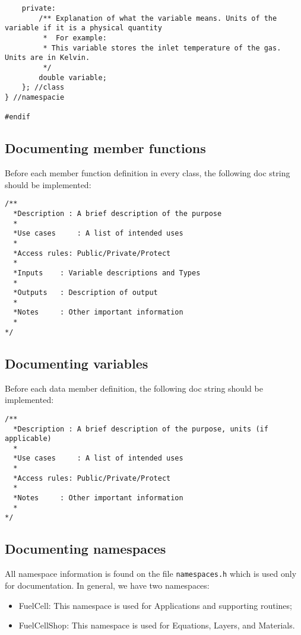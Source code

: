 \begin{lstlisting}
    private:
        /** Explanation of what the variable means. Units of the variable if it is a physical quantity
         *  For example:
         * This variable stores the inlet temperature of the gas. Units are in Kelvin.
         */
        double variable;
    }; //class
} //namespacie

#endif
\end{lstlisting}

\subsection{Documenting member functions} 

Before each member function definition in every class, the following doc string should be implemented:
  
\begin{lstlisting}
/**
  *Description : A brief description of the purpose 
  *
  *Use cases	 : A list of intended uses
  *
  *Access rules: Public/Private/Protect
  *
  *Inputs	 : Variable descriptions and Types
  *
  *Outputs	 : Description of output
  *
  *Notes	 : Other important information
  *
*/
\end{lstlisting}
  
\subsection{Documenting variables} 

Before each data member definition, the following doc string should be implemented:  
\begin{lstlisting}
/**
  *Description : A brief description of the purpose, units (if applicable) 
  *
  *Use cases	 : A list of intended uses
  *
  *Access rules: Public/Private/Protect
  *
  *Notes	 : Other important information
  *
*/
\end{lstlisting}
  
\subsection{Documenting namespaces}

All namespace information is found on the file \texttt{namespaces.h} which is used only for documentation. In general, we have two namespaces:

\begin{itemize}
 \item FuelCell: This namespace is used for Applications and supporting routines;
 \item FuelCellShop: This namespace is used for Equations, Layers, and Materials.
\end{itemize}


